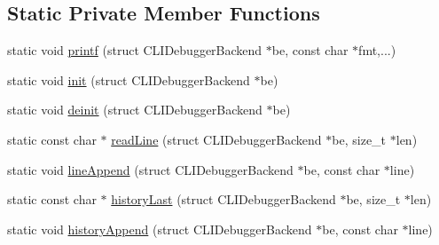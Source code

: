 \subsection*{Static Private Member Functions}
\begin{DoxyCompactItemize}
\item 
static void \mbox{\hyperlink{class_q_g_b_a_1_1_debugger_console_controller_aaae3fe25316ede20b3000031c547ae68}{printf}} (struct C\+L\+I\+Debugger\+Backend $\ast$be, const char $\ast$fmt,...)
\item 
static void \mbox{\hyperlink{class_q_g_b_a_1_1_debugger_console_controller_a1c0f033ca89799d97112aedf238b4cf9}{init}} (struct C\+L\+I\+Debugger\+Backend $\ast$be)
\item 
static void \mbox{\hyperlink{class_q_g_b_a_1_1_debugger_console_controller_aeffc611f76eb08424a00f32a0fd7ecda}{deinit}} (struct C\+L\+I\+Debugger\+Backend $\ast$be)
\item 
static const char $\ast$ \mbox{\hyperlink{class_q_g_b_a_1_1_debugger_console_controller_a67c80cd51a818693fe1d8d27bcadbcce}{read\+Line}} (struct C\+L\+I\+Debugger\+Backend $\ast$be, size\+\_\+t $\ast$len)
\item 
static void \mbox{\hyperlink{class_q_g_b_a_1_1_debugger_console_controller_af4cf6360667c1b7ada06c8a59a1bfa60}{line\+Append}} (struct C\+L\+I\+Debugger\+Backend $\ast$be, const char $\ast$line)
\item 
static const char $\ast$ \mbox{\hyperlink{class_q_g_b_a_1_1_debugger_console_controller_afda20b5c97f454990907a2f016ea62a7}{history\+Last}} (struct C\+L\+I\+Debugger\+Backend $\ast$be, size\+\_\+t $\ast$len)
\item 
static void \mbox{\hyperlink{class_q_g_b_a_1_1_debugger_console_controller_a4db0f8c964e69b7fde4e5bc79f30353e}{history\+Append}} (struct C\+L\+I\+Debugger\+Backend $\ast$be, const char $\ast$line)
\end{DoxyCompactItemize}
